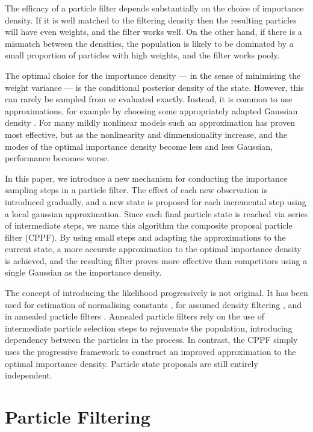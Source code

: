 \documentclass[conference]{IEEEtran}
\begin{document}
The efficacy of a particle filter depends substantially on the choice of importance density. If it is well matched to the filtering density then the resulting particles will have even weights, and the filter works well. On the other hand, if there is a mismatch between the densities, the population is likely to be dominated by a small proportion of particles with high weights, and the filter works pooly.

The optimal choice for the importance density --- in the sense of minimising the weight variance --- is the conditional posterior density of the state. However, this can rarely be sampled from or evaluated exactly. Instead, it is common to use approximations, for example by choosing some appropriately adapted Gaussian density \cite{Doucet2000a}. For many mildly nonlinear models such an approximation has proven most effective, but as the nonlinearity and dimnensionality increase, and the modes of the optimal importance density become less and less Gaussian, performance becomes worse.

In this paper, we introduce a new mechanism for conducting the importance sampling steps in a particle filter. The effect of each new observation is introduced gradually, and a new state is proposed for each incremental step using a local gaussian approximation. Since each final particle state is reached via series of intermediate steps, we name this algorithm the composite proposal particle filter (CPPF). By using small steps and adapting the approximations to the current state, a more accurate approximation to the optimal importance density is achieved, and the resulting filter proves more effective than competitors using a single Gaussian as the importance density.

The concept of introducing the likelihood progressively is not original. It has been used for estimation of normalising constants \cite{Gelman1998}, for assumed density filtering \cite{Hanebeck2003a,Hanebeck2012,Hagmar2011}, and in annealed particle filters \cite{Godsill2001b,Neal2001,Gall2007,Deutscher2000}. Annealed particle filters rely on the use of intermediate particle selection steps to rejuvenate the population, introducing dependency between the particles in the process. In contrast, the CPPF simply uses the progressive framework to construct an improved approximation to the optimal importance density. Particle state proposals are still entirely independent.



\section{Particle Filtering}
\end{document}
